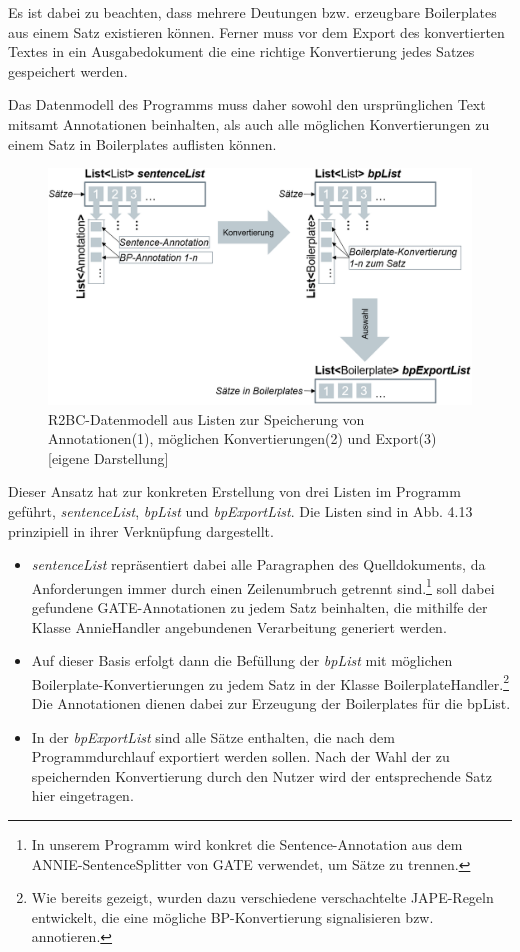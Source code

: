 \documentclass[12pt]{report}
\begin{document}
Es ist dabei zu beachten, dass mehrere Deutungen bzw. erzeugbare Boilerplates aus einem Satz existieren können. Ferner muss vor dem Export des konvertierten Textes in ein Ausgabedokument die eine richtige Konvertierung jedes Satzes gespeichert werden.

Das Datenmodell des Programms muss daher sowohl den ursprünglichen Text mitsamt Annotationen beinhalten, als auch alle möglichen Konvertierungen zu einem Satz in Boilerplates auflisten können.

\begin{figure}[h!]
\begin{center}
\includegraphics[scale=0.63]{Bilder/Listenarchitektur.png}
\caption{R2BC-Datenmodell aus Listen zur Speicherung von Annotationen(1), möglichen Konvertierungen(2) und Export(3) [eigene Darstellung]}
\end{center}
\end{figure}

Dieser Ansatz hat zur konkreten Erstellung von drei Listen im Programm geführt, \textit{sentenceList}, \textit{bpList} und \textit{bpExportList}. Die Listen sind in Abb. 4.13 prinzipiell in ihrer Verknüpfung dargestellt. 

\begin{itemize}
\item \textit{sentenceList} repräsentiert dabei alle Paragraphen des Quelldokuments, da Anforderungen immer durch einen Zeilenumbruch getrennt sind.\footnote{In unserem Programm wird konkret die Sentence-Annotation aus dem ANNIE-SentenceSplitter von GATE verwendet, um Sätze zu trennen.} soll dabei gefundene GATE-Annotationen zu jedem Satz beinhalten, die mithilfe der Klasse AnnieHandler angebundenen Verarbeitung generiert werden.
\item Auf dieser Basis erfolgt dann die Befüllung der \textit{bpList} mit möglichen Boilerplate-Konvertierungen zu jedem Satz in der Klasse BoilerplateHandler.\footnote{Wie bereits gezeigt, wurden dazu verschiedene verschachtelte JAPE-Regeln entwickelt, die eine mögliche BP-Konvertierung signalisieren bzw. annotieren.} Die Annotationen dienen dabei zur Erzeugung der Boilerplates für die bpList.
\item In der \textit{bpExportList} sind alle Sätze enthalten, die nach dem Programmdurchlauf exportiert werden sollen. Nach der Wahl der zu speichernden Konvertierung durch den Nutzer wird der entsprechende Satz hier eingetragen.
\end{itemize}
\end{document}
